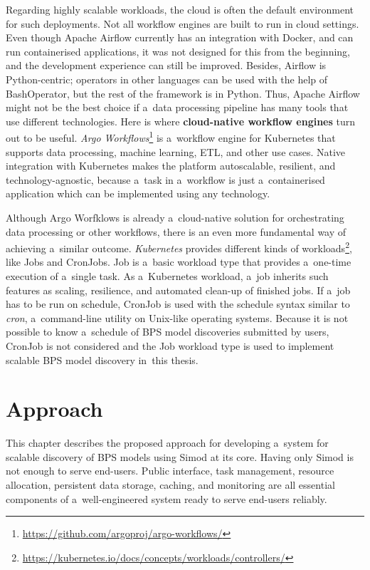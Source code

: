 \documentclass[12pt]{article}
\begin{document}
Regarding highly scalable workloads, the cloud is often the default environment for such deployments. Not all workflow engines are built to run in cloud settings. Even though Apache Airflow currently has an integration with Docker, and can run containerised applications, it was not designed for this from the beginning, and the development experience can still be improved. Besides, Airflow is Python-centric; operators in other languages can be used with the help of BashOperator, but the rest of the framework is in Python. Thus, Apache Airflow might not be the best choice if a~data processing pipeline has many tools that use different technologies. Here is where \textbf{cloud-native workflow engines} turn out to be useful. \emph{Argo Workflows}\footnote{\href{https://github.com/argoproj/argo-workflows/}{https://github.com/argoproj/argo-workflows/}} is a~workflow engine for Kubernetes that supports data processing, machine learning, ETL, and other use cases. Native integration with Kubernetes makes the platform autoscalable, resilient, and technology-agnostic, because a~task in a~workflow is just a~containerised application which can be implemented using any technology.

Although Argo Worfklows is already a~cloud-native solution for orchestrating data processing or other workflows, there is an even more fundamental way of achieving a~similar outcome. 
\emph{Kubernetes} provides different kinds of workloads\footnote{\href{https://kubernetes.io/docs/concepts/workloads/controllers/}{https://kubernetes.io/docs/concepts/workloads/controllers/}}, like Jobs and CronJobs. 
Job is a~basic workload type that provides a~one-time execution of a~single task. 
As a~Kubernetes workload, a~job inherits such features as scaling, resilience, and automated clean-up of finished jobs. 
If a~job has to be run on schedule, CronJob is used with the schedule syntax similar to \emph{cron}, a~command-line utility on Unix-like operating systems. 
Because it is not possible to know a~schedule of BPS model discoveries submitted by users, CronJob is not considered and the Job workload type is used to implement scalable BPS model discovery in~this thesis.

\newpage
\section{Approach} \label{ch:approach}

This chapter describes the proposed approach for developing a~system for scalable discovery of BPS models using Simod at its core. Having only Simod is not enough to serve end-users. Public interface, task management, resource allocation, persistent data storage, caching, and monitoring are all essential components of a~well-engineered system ready to serve end-users reliably. 
\end{document}
